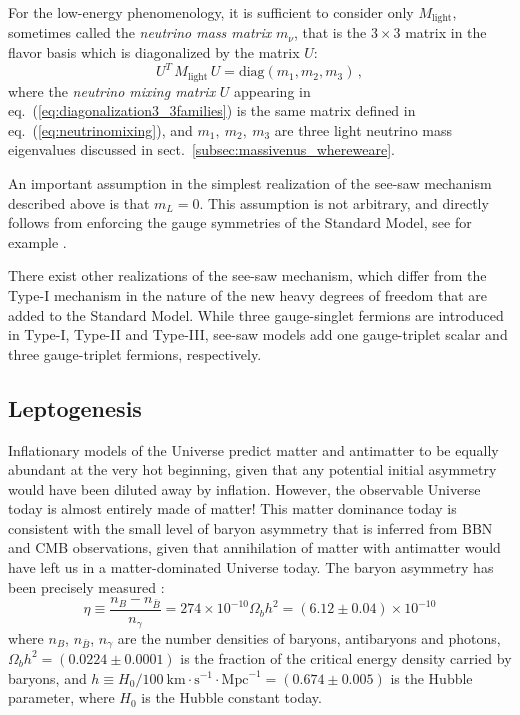 For the low-energy phenomenology, it is sufficient to consider only $M_{\text{light}}$, sometimes called the \emph{neutrino mass matrix} $m_{\nu}$, that is the $3\times3$ matrix in the flavor basis which is diagonalized by the matrix $U$:
%
\begin{equation}
U^T \, M_{\text{light}} \, U
=
\text{diag}\!\left(m_1,m_2,m_3\right)
\,,
\label{eq:diagonalization3_3families}
\end{equation}
%
\noindent where the \emph{neutrino mixing matrix} $U$ appearing in eq.~(\ref{eq:diagonalization3_3families}) is the same matrix defined in eq.~(\ref{eq:neutrinomixing}), and $m_1,\ m_2,\ m_3$ are three light neutrino mass eigenvalues discussed in sect.~\ref{subsec:massivenus_whereweare}.

An important assumption in the simplest realization of the see-saw mechanism described above is that $m_L=0$. This assumption is not arbitrary, and directly follows from enforcing the gauge symmetries of the Standard Model, see for example \cite{Giunti:2003qt}. 

There exist other realizations of the see-saw mechanism, which differ from the Type-I mechanism in the nature of the new heavy degrees of freedom that are added to the Standard Model. While three gauge-singlet fermions are introduced in Type-I, Type-II and Type-III, see-saw models add one gauge-triplet scalar and three gauge-triplet fermions, respectively. 



\subsection{\label{subsec:massivenus_leptogenesis}Leptogenesis}

Inflationary models of the Universe predict matter and antimatter to be equally abundant at the very hot beginning, given that any potential initial asymmetry would have been diluted away by inflation. However, the observable Universe today is almost entirely made of matter! This matter dominance today is consistent with the small level of baryon asymmetry that is inferred from BBN and CMB observations, given that annihilation of matter with antimatter would have left us in a matter-dominated Universe today. The baryon asymmetry has been precisely measured \cite{ParticleDataGroup:2022pth,Planck:2018vyg}:
%
\begin{equation}
\eta \equiv \frac{n_B-n_{\bar{B}}}{n_{\gamma}} = 274\times 10^{-10}\Omega_bh^2 = (6.12\pm 0.04)\times 10^{-10} \label{eq:measuredbaryonasymmetry}
\end{equation}
%
where $n_B$, $n_{\bar{B}}$, $n_{\gamma}$ are the number densities of baryons, antibaryons and photons, $\Omega_bh^2=(0.0224\pm 0.0001)$ is the fraction of the critical energy density carried by baryons, and $h\equiv H_0/100\ \text{km}\cdot\text{s}^{-1}\cdot\text{Mpc}^{-1}=(0.674\pm 0.005)$ is the Hubble parameter, where $H_0$ is the Hubble constant today.

